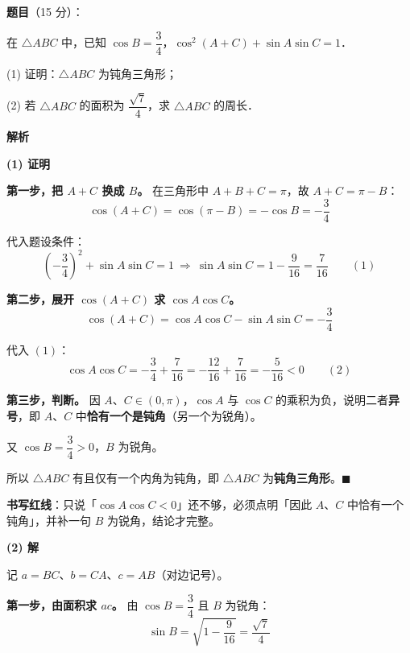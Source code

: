 \begin{answer}

\textbf{题目}（15 分）：

在 $\triangle ABC$ 中，已知 $\cos B=\dfrac{3}{4}$，$\cos^2(A+C)+\sin A\sin C=1$．

  (1) 证明：$\triangle ABC$ 为钝角三角形；

  (2) 若 $\triangle ABC$ 的面积为 $\dfrac{\sqrt{7}}{4}$，求 $\triangle ABC$ 的周长．

\textbf{解析}

\par\medskip

\textbf{(1) 证明}

\textbf{第一步，把 $A+C$ 换成 $B$。} 在三角形中 $A+B+C=\pi$，故 $A+C=\pi-B$：
\nopagebreak[4]
\[\cos(A+C)=\cos(\pi-B)=-\cos B=-\frac34\]

代入题设条件：
\nopagebreak[4]
\[\left(-\frac34\right)^2+\sin A\sin C=1\ \Longrightarrow\ \sin A\sin C=1-\frac{9}{16}=\frac{7}{16}\qquad(1)\]

\textbf{第二步，展开 $\cos(A+C)$ 求 $\cos A\cos C$。}
\nopagebreak[4]
\[\cos(A+C)=\cos A\cos C-\sin A\sin C=-\frac34\]

代入 $(1)$：
\nopagebreak[4]
\[\cos A\cos C=-\frac34+\frac{7}{16}=-\frac{12}{16}+\frac{7}{16}=-\frac{5}{16}<0\qquad(2)\]

\textbf{第三步，判断。} 因 $A$、$C\in(0,\pi)$，$\cos A$ 与 $\cos C$ 的乘积为负，说明二者\textbf{异号}，即 $A$、$C$ 中\textbf{恰有一个是钝角}（另一个为锐角）。

又 $\cos B=\dfrac34>0$，$B$ 为锐角。

所以 $\triangle ABC$ 有且仅有一个内角为钝角，即 $\triangle ABC$ 为\textbf{钝角三角形}。$\blacksquare$

\begin{gktip}
\textbf{书写红线}：只说「$\cos A\cos C<0$」还不够，必须点明「因此 $A$、$C$ 中恰有一个钝角」，并补一句 $B$ 为锐角，结论才完整。
\end{gktip}

\par\medskip

\textbf{(2) 解}

记 $a=BC$、$b=CA$、$c=AB$（对边记号）。

\textbf{第一步，由面积求 $ac$。} 由 $\cos B=\dfrac34$ 且 $B$ 为锐角：
\nopagebreak[4]
\[\sin B=\sqrt{1-\frac{9}{16}}=\frac{\sqrt7}{4}\]


\end{answer}
